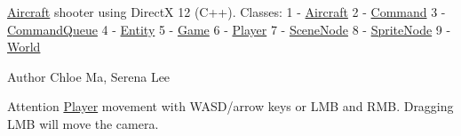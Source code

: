 \mbox{\hyperlink{class_aircraft}{Aircraft}} shooter using DirectX 12 (C++). Classes\+: 1 -\/ \mbox{\hyperlink{class_aircraft}{Aircraft}} 2 -\/ \mbox{\hyperlink{struct_command}{Command}} 3 -\/ \mbox{\hyperlink{class_command_queue}{Command\+Queue}} 4 -\/ \mbox{\hyperlink{class_entity}{Entity}} 5 -\/ \mbox{\hyperlink{class_game}{Game}} 6 -\/ \mbox{\hyperlink{class_player}{Player}} 7 -\/ \mbox{\hyperlink{class_scene_node}{Scene\+Node}} 8 -\/ \mbox{\hyperlink{class_sprite_node}{Sprite\+Node}} 9 -\/ \mbox{\hyperlink{class_world}{World}} \begin{DoxyAuthor}{Author}
Chloe Ma, Serena Lee 
\end{DoxyAuthor}
\begin{DoxyAttention}{Attention}
\mbox{\hyperlink{class_player}{Player}} movement with WASD/arrow keys or LMB and RMB. Dragging LMB will move the camera. 
\end{DoxyAttention}
